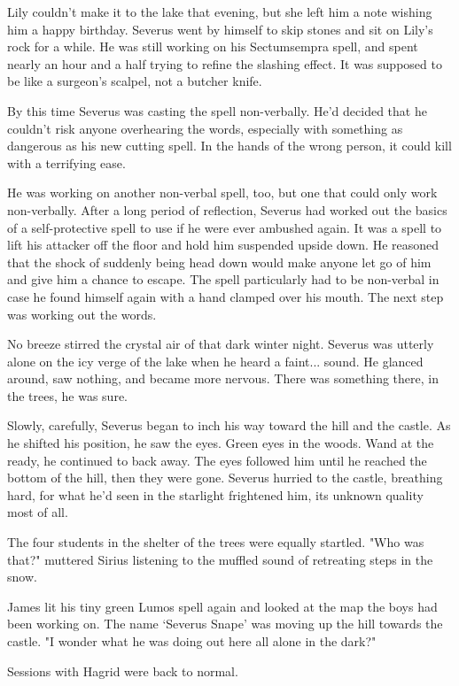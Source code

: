 \documentclass[a4paper,11pt]{article}
\begin{document}
Lily couldn't make it to the lake that evening, but she left him a note wishing him a happy birthday. Severus went by himself to skip stones and sit on Lily's rock for a while. He was still working on his Sectumsempra spell, and spent nearly an hour and a half trying to refine the slashing effect. It was supposed to be like a surgeon's scalpel, not a butcher knife.

By this time Severus was casting the spell non-verbally. He'd decided that he couldn't risk anyone overhearing the words, especially with something as dangerous as his new cutting spell. In the hands of the wrong person, it could kill with a terrifying ease.

He was working on another non-verbal spell, too, but one that could only work non-verbally. After a long period of reflection, Severus had worked out the basics of a self-protective spell to use if he were ever ambushed again. It was a spell to lift his attacker off the floor and hold him suspended upside down. He reasoned that the shock of suddenly being head down would make anyone let go of him and give him a chance to escape. The spell particularly had to be non-verbal in case he found himself again with a hand clamped over his mouth. The next step was working out the words.

No breeze stirred the crystal air of that dark winter night. Severus was utterly alone on the icy verge of the lake when he heard a faint... sound. He glanced around, saw nothing, and became more nervous. There was something there, in the trees, he was sure.

Slowly, carefully, Severus began to inch his way toward the hill and the castle. As he shifted his position, he saw the eyes. Green eyes in the woods. Wand at the ready, he continued to back away. The eyes followed him until he reached the bottom of the hill, then they were gone. Severus hurried to the castle, breathing hard, for what he'd seen in the starlight frightened him, its unknown quality most of all.

The four students in the shelter of the trees were equally startled. "Who was that?" muttered Sirius listening to the muffled sound of retreating steps in the snow.

James lit his tiny green Lumos spell again and looked at the map the boys had been working on. The name `Severus Snape' was moving up the hill towards the castle. "I wonder what he was doing out here all alone in the dark?"

Sessions with Hagrid were back to normal.
\end{document}
